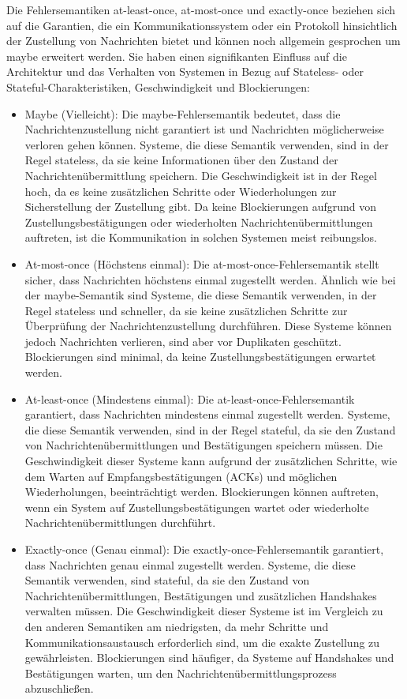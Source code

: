 \documentclass[../vs-script-first-v01.tex]{subfiles}
\begin{document}
Die Fehlersemantiken at-least-once, at-most-once und exactly-once beziehen sich auf die Garantien, die ein Kommunikationssystem oder ein Protokoll hinsichtlich der Zustellung von Nachrichten bietet und können noch allgemein gesprochen um maybe erweitert werden. Sie haben einen signifikanten Einfluss auf die Architektur und das Verhalten von Systemen in Bezug auf Stateless- oder Stateful-Charakteristiken, Geschwindigkeit und Blockierungen:
\begin{itemize}
\item  Maybe (Vielleicht): Die maybe-Fehlersemantik bedeutet, dass die Nachrichtenzustellung nicht garantiert ist und Nachrichten möglicherweise verloren gehen können. Systeme, die diese Semantik verwenden, sind in der Regel stateless, da sie keine Informationen über den Zustand der Nachrichtenübermittlung speichern. Die Geschwindigkeit ist in der Regel hoch, da es keine zusätzlichen Schritte oder Wiederholungen zur Sicherstellung der Zustellung gibt. Da keine Blockierungen aufgrund von Zustellungsbestätigungen oder wiederholten Nachrichtenübermittlungen auftreten, ist die Kommunikation in solchen Systemen meist reibungslos.
\item At-most-once (Höchstens einmal): Die at-most-once-Fehlersemantik stellt sicher, dass Nachrichten höchstens einmal zugestellt werden. Ähnlich wie bei der maybe-Semantik sind Systeme, die diese Semantik verwenden, in der Regel stateless und schneller, da sie keine zusätzlichen Schritte zur Überprüfung der Nachrichtenzustellung durchführen. Diese Systeme können jedoch Nachrichten verlieren, sind aber vor Duplikaten geschützt. Blockierungen sind minimal, da keine Zustellungsbestätigungen erwartet werden.
\item At-least-once (Mindestens einmal): Die at-least-once-Fehlersemantik garantiert, dass Nachrichten mindestens einmal zugestellt werden. Systeme, die diese Semantik verwenden, sind in der Regel stateful, da sie den Zustand von Nachrichtenübermittlungen und Bestätigungen speichern müssen. Die Geschwindigkeit dieser Systeme kann aufgrund der zusätzlichen Schritte, wie dem Warten auf Empfangsbestätigungen (ACKs) und möglichen Wiederholungen, beeinträchtigt werden. Blockierungen können auftreten, wenn ein System auf Zustellungsbestätigungen wartet oder wiederholte Nachrichtenübermittlungen durchführt.
\item Exactly-once (Genau einmal): Die exactly-once-Fehlersemantik garantiert, dass Nachrichten genau einmal zugestellt werden. Systeme, die diese Semantik verwenden, sind stateful, da sie den Zustand von Nachrichtenübermittlungen, Bestätigungen und zusätzlichen Handshakes verwalten müssen. Die Geschwindigkeit dieser Systeme ist im Vergleich zu den anderen Semantiken am niedrigsten, da mehr Schritte und Kommunikationsaustausch erforderlich sind, um die exakte Zustellung zu gewährleisten. Blockierungen sind häufiger, da Systeme auf Handshakes und Bestätigungen warten, um den Nachrichtenübermittlungsprozess abzuschließen.
\end{itemize}
\end{document}
